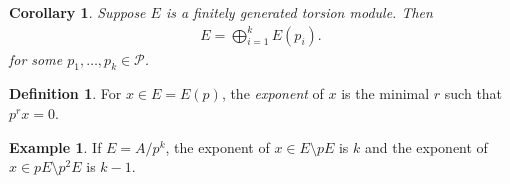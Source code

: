 \documentclass[12pt]{report}
\theoremstyle{plain}
\newtheorem{corollary}[theorem]{Corollary}
\theoremstyle{remark}
\theoremstyle{definition}
\newtheorem{definition}[theorem]{Definition}
\newtheorem{example}[theorem]{Example}
\begin{document}
\begin{corollary}
    Suppose $E$ is a finitely generated torsion module. Then
    \begin{align*}
        E = \bigoplus_{i=1}^kE(p_i).
    \end{align*}
    for some $p_1,\dots,p_k\in \mathcal{P}$.
\end{corollary}

\begin{definition}
    For $x\in E=E(p)$, the \emph{exponent} of $x$ is the minimal $r$ such that $p^r x = 0$.
\end{definition}

\begin{example}
    If $E=A/p^k$, the exponent of $x\in E\setminus pE$ is $k$ and the exponent of $x\in pE\setminus p^2E$ is $k-1$.
\end{example}
\end{document}
